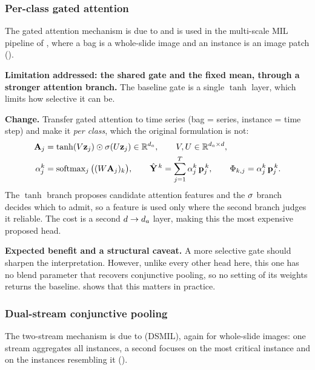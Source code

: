 \subsubsection{Per-class gated attention}
\label{sec:pool:gated}

\begin{priorwork}
The gated attention mechanism is due to \citet{ilse2018attention} and is used in the multi-scale MIL
pipeline of \citet{hashimoto2020msdamil}, where a bag is a whole-slide image and an instance is an
image patch ().
\end{priorwork}

\textbf{Limitation addressed: the shared gate and the fixed mean, through a stronger attention
branch.} The baseline gate is
a single $\tanh$ layer, which limits how selective it can be.

\textbf{Change.} Transfer gated attention to time series (bag = series, instance = time step) and
make it \emph{per class}, which the original formulation is not:
\begin{align}
  \mathbf{A}_j &= \tanh(V \mathbf{z}_j) \odot \sigma(U \mathbf{z}_j) \in \mathbb{R}^{d_a},
  \qquad V, U \in \mathbb{R}^{d_a \times d},
  \label{eq:ga_features}\\
  \alpha_j^k &= \operatorname{softmax}_j\big((W \mathbf{A}_j)_k\big),
  \qquad
  \hat{\mathbf{Y}}^{\,k} = \sum_{j=1}^{T} \alpha_j^k \, \mathbf{p}_j^{\,k},
  \qquad
  \Phi_{k,j} = \alpha_j^k \, \mathbf{p}_j^{\,k}.
  \label{eq:ga_bag}
\end{align}
The $\tanh$ branch proposes candidate attention features and the $\sigma$ branch decides which to
admit, so a feature is used only where the second branch judges it reliable. The cost is a second
$d \to d_a$ layer, making this the most expensive proposed head.

\textbf{Expected benefit and a structural caveat.} A more selective gate should sharpen the
interpretation. However, unlike every other head here, this one has no blend parameter that recovers
conjunctive pooling, so no setting of its weights returns the baseline. 
shows that this matters in practice.

\subsubsection{Dual-stream conjunctive pooling}
\label{sec:pool:dsmil}

\begin{priorwork}
The two-stream mechanism is due to \citet{li2021dsmil} (DSMIL), again for whole-slide images: one
stream aggregates all instances, a second focuses on the most critical instance and on the instances
resembling it ().
\end{priorwork}

